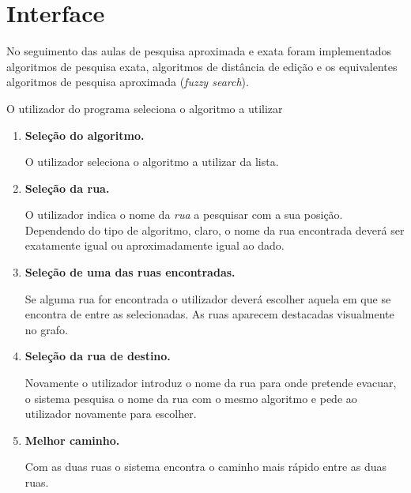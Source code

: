 \documentclass[relatorio.tex]{subfiles}
\begin{document}
\section{Interface}
\label{sec:impl}

No seguimento das aulas de pesquisa aproximada e exata foram implementados algoritmos de pesquisa exata, algoritmos de distância de edição e os equivalentes algoritmos de pesquisa aproximada (\textit{fuzzy search}).

O utilizador do programa seleciona o algoritmo a utilizar

\begin{enumerate}[listparindent=2em]
\item {\bfseries Seleção do algoritmo.}

O utilizador seleciona o algoritmo a utilizar da lista.

\item {\bfseries Seleção da rua.}

O utilizador indica o nome da \emph{rua} a pesquisar com a sua posição. Dependendo do tipo de algoritmo, claro, o nome da rua encontrada deverá ser exatamente igual ou aproximadamente igual ao dado.

\item {\bfseries Seleção de uma das ruas encontradas.}

Se alguma rua for encontrada o utilizador deverá escolher aquela em que se encontra de entre as selecionadas. As ruas aparecem destacadas visualmente no grafo.

\item {\bfseries Seleção da rua de destino.}

Novamente o utilizador introduz o nome da rua para onde pretende evacuar, o sistema pesquisa o nome da rua com o mesmo algoritmo e pede ao utilizador novamente para escolher.

\item {\bfseries Melhor caminho.}

Com as duas ruas o sistema encontra o caminho mais rápido entre as duas ruas.
\end{enumerate}
\end{document}
